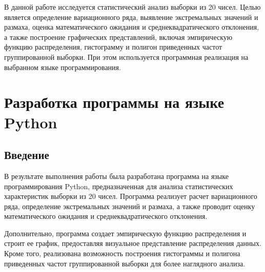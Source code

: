 \documentclass[14pt]{extreport}
\begin{document}
    \pagestyle{empty} %
    

    \pagestyle{plain} %
    \tableofcontents
    \intro В данной работе исследуется статистический анализ выборки из 20 чисел. Целью является определение вариационного ряда, выявление экстремальных значений и размаха, оценка математического ожидания и среднеквадратического отклонения, а также построение графических представлений, включая эмпирическую функцию распределения, гистограмму и полигон приведенных частот группированной выборки. При этом используется программная реализация на выбранном языке программирования.

    \chapter{Разработка программы на языке Python}
        \section{Введение}
        В результате выполнения работы была разработана программа на языке программирования Python, предназначенная для анализа статистических характеристик выборки из 20 чисел. Программа реализует расчет вариационного ряда, определение экстремальных значений и размаха, а также проводит оценку математического ожидания и среднеквадратического отклонения.

        Дополнительно, программа создает эмпирическую функцию распределения и строит ее график, предоставляя визуальное представление распределения данных. Кроме того, реализована возможность построения гистограммы и полигона приведенных частот группированной выборки для более наглядного анализа.
        \newpage
\end{document}
